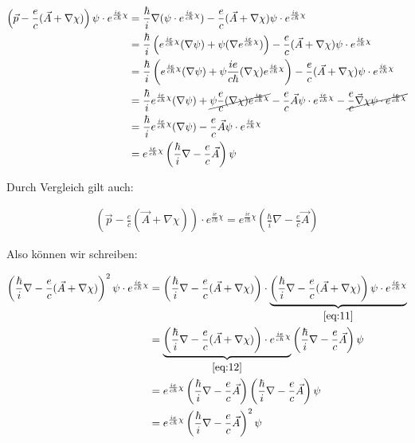 \begin{align}
  \label{eq:11}  
\left(\vec p - \frac{e}{c}(\vec A +\nabla\chi) \right)\psi\cdot e^{\frac{ie}{c\hbar}\chi}&= \frac{\hbar}{i}\nabla (\psi\cdot e^{\frac{ie}{c\hbar}\chi} ) - \frac{e}{c}(\vec A +\nabla\chi)\psi\cdot e^{\frac{ie}{c\hbar}\chi}\\ 
&= \frac{\hbar}{i}\left( e^{\frac{ie}{c\hbar}\chi}(\nabla \psi)+\psi(\nabla e^{\frac{ie}{c\hbar}\chi}) \right) - \frac{e}{c}(\vec A +\nabla\chi)\psi\cdot e^{\frac{ie}{c\hbar}\chi} \\
 &= \frac{\hbar}{i}\left( e^{\frac{ie}{c\hbar}\chi}(\nabla \psi)+\psi \frac{ie}{c\hbar}(\nabla\chi) e^{\frac{ie}{c\hbar}\chi} \right) - \frac{e}{c}(\vec A +\nabla\chi)\psi\cdot e^{\frac{ie}{c\hbar}\chi} \\
 &= \frac{\hbar}{i} e^{\frac{ie}{c\hbar}\chi} (\nabla \psi)+ \cancel{\psi \frac{e}{c}(\nabla\chi) e^{\frac{ie}{c\hbar}\chi}}  - \frac{e}{c}\vec A\psi\cdot e^{\frac{ie}{c\hbar}\chi}-\cancel{\frac{e}{c}\vec \nabla\chi \psi\cdot e^{\frac{ie}{c\hbar}\chi}} \\
 &= \frac{\hbar}{i} e^{\frac{ie}{c\hbar}\chi} (\nabla \psi) - \frac{e}{c}\vec A\psi\cdot e^{\frac{ie}{c\hbar}\chi}\\
&= e^{\frac{ie}{c\hbar}\chi}\left( \frac{\hbar}{i}\nabla- \frac{e}{c}\vec A \right) \psi
\end{align}


Durch Vergleich gilt auch:

\begin{align}
  \label{eq:12}
\left(\vec p - \frac{e}{c}(\vec A +\nabla\chi) \right)\cdot e^{\frac{ie}{c\hbar}\chi} = e^{\frac{ie}{c\hbar}\chi}\left( \frac{\hbar}{i}\nabla- \frac{e}{c}\vec A \right)
 \end{align}

Also können wir schreiben:

\begin{align}
  \label{eq:13}
 \left(\frac{\hbar}{i}\nabla - \frac{e}{c}(\vec A +\nabla\chi) \right)^2 \psi \cdot e^{\frac{ie}{c\hbar}\chi}  &=  \left(\frac{\hbar}{i}\nabla - \frac{e}{c}(\vec A +\nabla\chi) \right)\cdot \underbrace{ \left(\frac{\hbar}{i}\nabla - \frac{e}{c}(\vec A +\nabla\chi) \right)\psi \cdot e^{\frac{ie}{c\hbar}\chi}}_{\eqref{eq:11}} \\
&=  \underbrace{\left(\frac{\hbar}{i}\nabla - \frac{e}{c}(\vec A +\nabla\chi) \right) \cdot e^{\frac{ie}{c\hbar}\chi}}_{\eqref{eq:12}}\left( \frac{\hbar}{i}\nabla- \frac{e}{c}\vec A \right) \psi \\
&= e^{\frac{ie}{c\hbar}\chi}\left( \frac{\hbar}{i}\nabla- \frac{e}{c}\vec A \right) \left( \frac{\hbar}{i}\nabla- \frac{e}{c}\vec A \right) \psi\\
&= e^{\frac{ie}{c\hbar}\chi}\left( \frac{\hbar}{i}\nabla- \frac{e}{c}\vec A \right)^2\psi
 \end{align}

